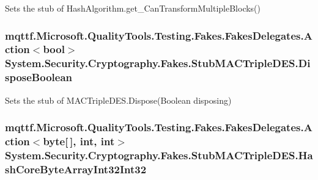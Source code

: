 Sets the stub of Hash\-Algorithm.\-get\-\_\-\-Can\-Transform\-Multiple\-Blocks()

\hypertarget{class_system_1_1_security_1_1_cryptography_1_1_fakes_1_1_stub_m_a_c_triple_d_e_s_affc9addd80af94e1db91c0d9feca781e}{
\subsubsection[{Dispose\-Boolean}]{\setlength{\rightskip}{0pt plus 5cm}mqttf.\-Microsoft.\-Quality\-Tools.\-Testing.\-Fakes.\-Fakes\-Delegates.\-Action$<$bool$>$ System.\-Security.\-Cryptography.\-Fakes.\-Stub\-M\-A\-C\-Triple\-D\-E\-S.\-Dispose\-Boolean}}\label{class_system_1_1_security_1_1_cryptography_1_1_fakes_1_1_stub_m_a_c_triple_d_e_s_affc9addd80af94e1db91c0d9feca781e}


Sets the stub of M\-A\-C\-Triple\-D\-E\-S.\-Dispose(\-Boolean disposing)

\hypertarget{class_system_1_1_security_1_1_cryptography_1_1_fakes_1_1_stub_m_a_c_triple_d_e_s_a2ad3d852f03e8ead97db1395e2211e33}{
\subsubsection[{Hash\-Core\-Byte\-Array\-Int32\-Int32}]{\setlength{\rightskip}{0pt plus 5cm}mqttf.\-Microsoft.\-Quality\-Tools.\-Testing.\-Fakes.\-Fakes\-Delegates.\-Action$<$byte\mbox{[}$\,$\mbox{]}, int, int$>$ System.\-Security.\-Cryptography.\-Fakes.\-Stub\-M\-A\-C\-Triple\-D\-E\-S.\-Hash\-Core\-Byte\-Array\-Int32\-Int32}}\label{class_system_1_1_security_1_1_cryptography_1_1_fakes_1_1_stub_m_a_c_triple_d_e_s_a2ad3d852f03e8ead97db1395e2211e33}


